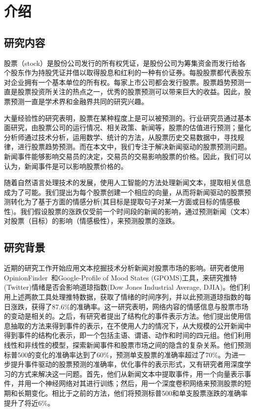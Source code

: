\chapter{介绍}
\label{cha:introduction}

\section{研究内容}

股票（stock）是股份公司发行的所有权凭证，是股份公司为筹集资金而发行给各个股东作为持股凭证并借以取得股息和红利的一种有价证券。每股股票都代表股东对企业拥有一个基本单位的所有权。每家上市公司都会发行股票。股票趋势预测一直是股票投资所关注的热点之一，优秀的股票预测可以带来巨大的收益。因此，股票预测一直是学术界和金融界共同的研究兴趣。

大量经验性的研究表明，股票在某种程度上是可以被预测的。行业研究员通过基本面研究，由股票公司的运行情况、相关政策、新闻等，股票的估值进行预测；量化分析师通过技术分析，运用数学、统计的方法，从股票历史交易数据中，寻找规律，进行股票趋势预测。而在本文中，我们专注于解决新闻驱动的股票预测问题。新闻事件能够影响交易员的决定，交易员的交易影响股票的价格。因此，我们可以认为，新闻事件是可以影响股票价格的。

随着自然语言处理技术的发展，使用人工智能的方法处理新闻文本，提取相关信息成为了可能。我们提出为每个股票创建一个相应的向量，从而将新闻驱动的股票预测转化为了基于方面的情感分析(其目标是提取句子对某一方面或目标的情感极性)。我们假设股票的涨跌仅受前一个时间段的新闻的影响，通过预测新闻（文本）对股票（目标）的影响（情感极性），来预测股票的涨跌。
\section{研究背景}

近期的研究工作开始应用文本挖掘技术分析新闻对股票市场的影响。研究者使用OpinionFinder~\cite{Wilson2005OpinionFinder}和Google-Profile of Mood States (GPOMS)工具，来研究推特(Twitter)情绪是否会影响道琼指数(Dow Jones Industrial Average, DJIA)\cite{bollen2011twitter}。他们利用上述两款工具处理推特数据，获取了情绪的时间序列，并以此预测道琼指数的每日涨跌，获得了87.6\%的准确率。这一研究表明，网络内容的情感信息与股票市场的变动是相关的。之后，有研究者提出了结构化的事件表示方法\cite{ding2014using}。他们提出使用信息抽取的方法来得到事件的表示，在不使用人力的情况下，从大规模的公开新闻中得到事件的结构化表示，即一个包括主语、谓语、动作和时间的四元组。他们利用线性和非线性的模型，探索新闻事件和股票市场之间的隐含的复杂关系。他们预测标普500的变化的准确率达到了60\%，预测单支股票的准确率超过了70\%。为进一步提升事件驱动的股票预测的准确率，优化事件的表示形式，又有研究者用深度学习的方式来解决这一问题\cite{ding2015deep}。首先，他们从新闻文本中提取事件，用一个向量表示事件，并用一个神经网络对其进行训练；然后，用一个深度卷积网络来预测股票的短期和长期变化。相比于之前的方法，他们将预测标普500和单支股票涨跌的准确率提升了将近6\%。

